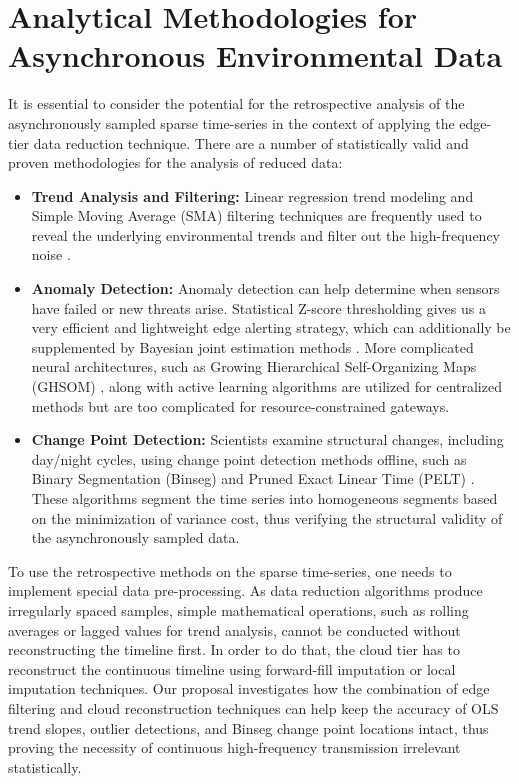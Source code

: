\section{Analytical Methodologies for Asynchronous Environmental Data}
It is essential to consider the potential for the retrospective analysis of the asynchronously sampled sparse time-series in the context of applying the edge-tier data reduction technique. There are a number of statistically valid and proven methodologies for the analysis of reduced data:
\begin{itemize}
    \item \textbf{Trend Analysis and Filtering:} Linear regression trend modeling and Simple Moving Average (SMA) filtering techniques are frequently used to reveal the underlying environmental trends and filter out the high-frequency noise \cite{ref6, ref26, ref46, ref20, ref40, ref60}.
   \item \textbf{Anomaly Detection:} Anomaly detection can help determine when sensors have failed or new threats arise. Statistical Z-score thresholding gives us a very efficient and lightweight edge alerting strategy, which can additionally be supplemented by Bayesian joint estimation methods \cite{ref19, ref39, ref59}. More complicated neural architectures, such as Growing Hierarchical Self-Organizing Maps (GHSOM) \cite{ref10, ref30, ref50}, along with active learning algorithms \cite{ref9, ref29, ref49} are utilized for centralized methods but are too complicated for resource-constrained gateways.
    \item \textbf{Change Point Detection:} Scientists examine structural changes, including day/night cycles, using change point detection methods offline, such as Binary Segmentation (Binseg) and Pruned Exact Linear Time (PELT) \cite{ref11, ref31, ref51, ref12, ref32, ref52}. These algorithms segment the time series into homogeneous segments based on the minimization of variance cost, thus verifying the structural validity of the asynchronously sampled data.
\end{itemize}

To use the retrospective methods on the sparse time-series, one needs to implement special data pre-processing. As data reduction algorithms produce irregularly spaced samples, simple mathematical operations, such as rolling averages or lagged values for trend analysis, cannot be conducted without reconstructing the timeline first. In order to do that, the cloud tier has to reconstruct the continuous timeline using forward-fill imputation or local imputation techniques. Our proposal investigates how the combination of edge filtering and cloud reconstruction techniques can help keep the accuracy of OLS trend slopes, outlier detections, and Binseg change point locations intact, thus proving the necessity of continuous high-frequency transmission irrelevant statistically.

